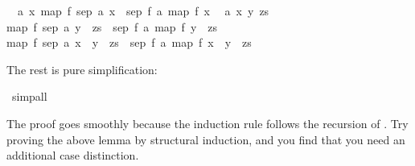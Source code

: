 \begin{isabellebody}
\begin{isamarkuptxt}
\begin{isabelle}
\ {}{}\ {}a\ x{}\ map\ f\ {}sep\ a\ {}x{}{}\ {}\ sep\ {}f\ a{}\ {}map\ f\ {}x{}{}\isanewline
\ {}{}\ {}a\ x\ y\ zs{}\isanewline
{}map\ f\ {}sep\ a\ {}y\ {}\ zs{}{}\ {}\ sep\ {}f\ a{}\ {}map\ f\ {}y\ {}\ zs{}{}\ {}\isanewline
{}map\ f\ {}sep\ a\ {}x\ {}\ y\ {}\ zs{}{}\ {}\ sep\ {}f\ a{}\ {}map\ f\ {}x\ {}\ y\ {}\ zs{}{}%
\end{isabelle}
The rest is pure simplification:%
\end{isamarkuptxt}%
\isamarkuptrue%
\isamarkupfalse%
\ simp{}all\isanewline
{}\isamarkupfalse%
%
\endisatagproof
{\isafoldproof}%
%
\isadelimproof
%
\endisadelimproof
%
\begin{isamarkuptext}%
\noindent The proof goes smoothly because the induction rule
follows the recursion of .  Try proving the above lemma by
structural induction, and you find that you need an additional case
distinction.


\end{isamarkuptext}
\end{isabellebody}
